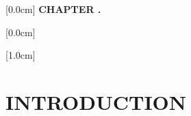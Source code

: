\documentclass[a4paper,13pt,3p,twoside]{report}
\title{\bf \TITLE}
\author{\AUTHOR}
\renewcommand{\figurename}{Figure}
\renewcommand{\tablename}{Table}
\renewcommand{\chaptername}{CHAPTER}
\theoremstyle{definition}
\begin{document}



\renewcommand{\figurename}{Figure}
\renewcommand{\tablename}{Table}
\renewcommand{\chaptername}{CHAPTER}

\newpage


\newpage


\newpage
{}
\renewcommand*\contentsname{TABLE OF CONTENTS}

    [0.0cm]
    {\bfseries\vspace{0.3cm}}
    {{\bfseries{\scshape}
    CHAPTER \thecontentslabel.\ }}
    {}
    {\contentspage}

    [0.0cm]
    {\vspace{0.3cm}}
    {\thecontentslabel \ }
    {}
    {\contentspage}

    [1.0cm]
    {\vspace{0.3cm}}
    {\thecontentslabel \ }
    {}
    {\contentspage}

\tableofcontents
\thispagestyle{empty}
\cleardoublepage

\renewcommand{\listfigurename}{LIST OF FIGURES}
{\let\oldnumberline\numberline
\renewcommand{\numberline}{Figure~\oldnumberline}
\listoffigures}
\newpage

\renewcommand{\listtablename}{LIST OF TABLES}
{\let\oldnumberline\numberline
\renewcommand{\numberline}{Table~\oldnumberline}
\listoftables}

\glsaddall
\renewcommand*{\acronymname}{LIST OF ABBREVIATIONS}
\renewcommand*{\entryname}{Abbreviation}
\renewcommand*{\descriptionname}{Full Expression}
\printnoidxglossaries


\newpage
{}

\pagestyle{fancy}
\fancyhf{}
\fancyhead[RE, LO]{\leftmark}
\fancyfoot[RE, LO]{\thepage}

\chapter{INTRODUCTION}
\label{chapter:Introduction}

\end{document}
